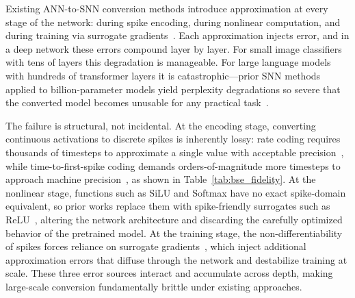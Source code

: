 \documentclass{article}
\theoremstyle{plain}
\theoremstyle{definition}
\theoremstyle{remark}
\begin{document}
Existing ANN-to-SNN conversion methods introduce approximation at every stage of the
network: during spike encoding, during nonlinear computation, and during training via
surrogate gradients~\citep{neftci2019surrogate,wu2018stbp,rueckauer2017conversion}.
Each approximation injects error, and in a deep network these errors compound layer by
layer. For small image classifiers with tens of layers this degradation is manageable.
For large language models with hundreds of transformer layers it is catastrophic---prior SNN methods applied to billion-parameter models yield perplexity degradations so severe that the converted model becomes unusable for any practical task~\citep{xing2025spikellm}.

The failure is structural, not incidental. At the encoding stage, converting continuous activations to discrete spikes is inherently lossy: rate coding requires thousands of timesteps to approximate a single value with acceptable
precision~\citep{rueckauer2017conversion,auge2021encoding}, while time-to-first-spike
coding demands orders-of-magnitude more timesteps to approach machine precision~\citep{bonilla2022ttfs,stanojevic2024ttfs}, as shown in
Table~\ref{tab:bse_fidelity}. At the nonlinear stage, functions such as SiLU and
Softmax have no exact spike-domain equivalent, so prior works replace them with
spike-friendly surrogates such as
ReLU~\citep{zhou2023spikformer,yao2023sdt,spikedattention2024}, altering the network
architecture and discarding the carefully optimized behavior of the pretrained model.
At the training stage, the non-differentiability of spikes forces reliance on surrogate gradients~\citep{neftci2019surrogate,shrestha2018slayer,deng2022tet}, which inject additional approximation errors that diffuse through the network and destabilize training at scale. These three error sources interact and accumulate across depth, making large-scale conversion fundamentally brittle under existing approaches.
\end{document}
